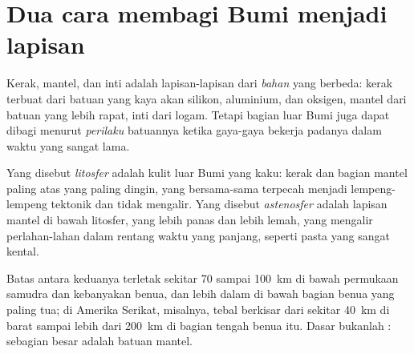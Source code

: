 \section{Dua cara membagi Bumi menjadi lapisan}

Kerak, mantel, dan inti adalah lapisan-lapisan dari \emph{bahan} yang berbeda:
kerak terbuat dari batuan yang kaya akan silikon, aluminium, dan oksigen, mantel
dari batuan yang lebih rapat, inti dari logam. Tetapi bagian luar Bumi juga
dapat dibagi menurut \emph{perilaku} batuannya ketika gaya-gaya bekerja
padanya dalam waktu yang sangat lama.

\begin{definition}\label{def:g11:lithosphere-asthenosphere:lithosphere}
Yang disebut \emph{litosfer} adalah kulit luar Bumi yang kaku:
kerak dan bagian mantel paling atas yang paling dingin, yang bersama-sama
terpecah menjadi lempeng-lempeng tektonik dan tidak mengalir. Yang disebut
\emph{astenosfer} adalah lapisan mantel di bawah litosfer,
yang lebih panas dan lebih lemah, yang mengalir
perlahan-lahan dalam rentang waktu yang panjang, seperti pasta yang sangat kental.
\end{definition}

Batas antara keduanya terletak sekitar 70 sampai \qty{100}{km} di bawah
permukaan samudra dan kebanyakan benua, dan lebih dalam di bawah bagian benua
yang paling tua; di Amerika Serikat, misalnya, tebal  berkisar dari
sekitar \qty{40}{km} di barat sampai lebih dari \qty{200}{km} di bagian tengah
benua itu. Dasar  bukanlah : sebagian besar  adalah batuan
mantel.

